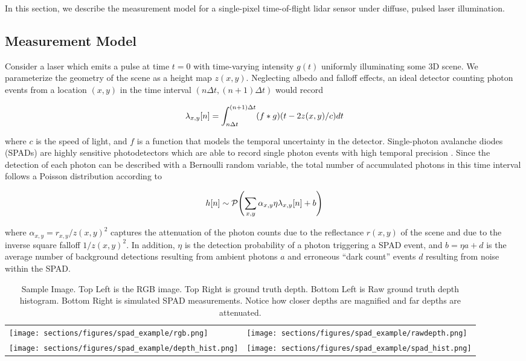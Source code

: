 In this section, we describe the measurement model for a single-pixel
time-of-flight lidar sensor under diffuse, pulsed laser illumination. 
\subsection{Measurement Model}
Consider a laser which emits a pulse at time $t = 0$ with time-varying intensity
$g(t)$ uniformly illuminating some 3D scene. We parameterize the geometry of the
scene as a height map $z(x, y)$.
Neglecting albedo and falloff effects, an ideal detector counting photon events
from a location $(x,y)$ in the time interval $(n\Delta t, (n+1) \Delta t)$ would record

\begin{equation}
  \lambda_{x,y}[n] = \int_{n\Delta t}^{(n+1) \Delta t} (f * g)\paren*{t - 2z(x,y)/c} dt \label{single_loc_spad} 
\end{equation}  

where $c$ is the speed of light, and $f$ is a function that models the temporal uncertainty in the
detector. Single-photon avalanche diodes (SPADs) are highly sensitive
photodetectors which are able to record single photon events with high temporal
precision \cite{Stuff}. Since the detection of each photon can be described with
a Bernoulli random variable,
the total number of accumulated photons in this time interval follows a Poisson
distribution according to

\begin{equation}
  h[n] \sim \mathcal{P}\paren*{\sum_{x,y}\alpha_{x,y}\eta \lambda_{x,y}[n] + b} \label{global_hints}
\end{equation}

where $\alpha_{x,y} = r_{x,y}/z(x,y)^2$ captures the attenuation of the
photon counts due to the reflectance $r(x,y)$ of the scene and due to the
inverse square falloff $1/z(x,y)^2$.
In addition, $\eta$ is the detection probability of a photon
triggering a SPAD event, and $b = \eta a + d$ is the average number of background detections resulting
from ambient photons $a$
and erroneous ``dark count'' events $d$ resulting from noise within the SPAD.
\newpage
\begin{table}[htbp]
  \begin{center}
    \begin{tabularx}{\linewidth}{*{2}{X}}
      \texttt{[image: sections/figures/spad\_example/rgb.png]} &
      \texttt{[image: sections/figures/spad\_example/rawdepth.png]} \\
      \texttt{[image: sections/figures/spad\_example/depth\_hist.png]} &
      \texttt{[image: sections/figures/spad\_example/spad\_hist.png]} \\
    \end{tabularx}
  \end{center}
  \caption{Sample Image. Top Left is the RGB image. Top Right is ground truth
    depth. Bottom Left is Raw ground truth depth histogram. Bottom Right is
    simulated SPAD measurements. Notice how closer depths are magnified and far
    depths are attenuated.}
\end{table}

